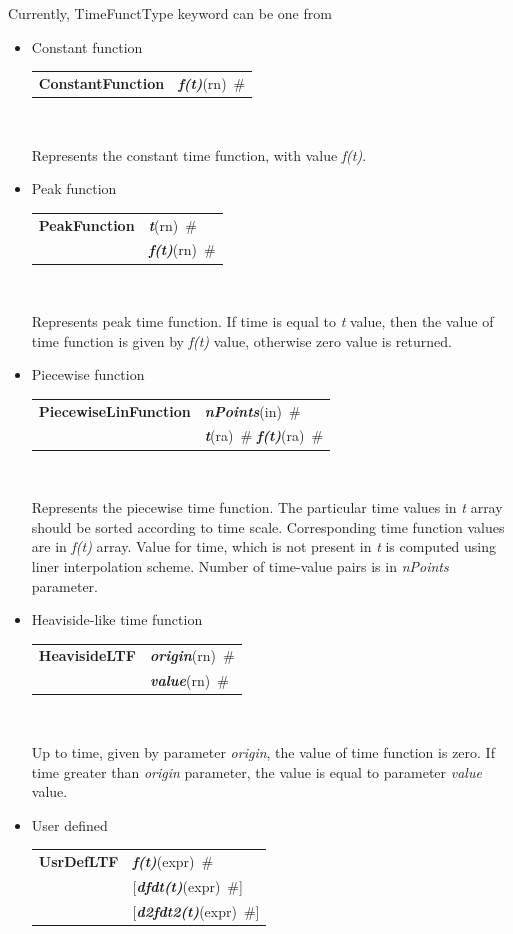 \documentclass[a4paper]{article}
\makeatletter
\newcommand{\param}[1]{{\em #1}}
\newcommand{\keywordnotype}[1]{\mbox{{\it{\bf{#1}}}}}
\newcommand{\keyword}[2]{\mbox{{\keywordnotype{#1}\tiny (#2)}}}
\newcommand{\entKeywordInst}[1]{\mbox{{\bf{{#1}}}}}
\newcommand{\field}[2]{\mbox{\keyword{#1}{#2}~\#}}
\newcommand{\optField}[2]{\mbox{[\field{#1}{#2}]}}
\newenvironment{record}[1][]{\begin{tabular}{|ll}}{\end{tabular}\\}
\newcommand{\recentry}[2]{{#1}&{#2}\\}
\newcounter{rcc}
\newenvironment{record}[1][\textwidth]{\setcounter{rcc}{0}\begin{tabular*}{#1}{|ll@{\extracolsep{\fill}}r}}{\end{tabular*}\\}
\newcommand{\recentry}[2]{\ifthenelse{\value{rcc}>0}{&$\backslash$ \\}{\setcounter{rcc}{1}}{#1}&{#2}}
\makeatother
\begin{document}
Currently, TimeFunctType keyword can be one from
\begin{itemize}
\item Constant function

\noindent
\begin{record}[0.9\textwidth]
    \recentry{\entKeywordInst{ConstantFunction}}{\field{f(t)}{rn}}
\end{record}

Represents the constant time function, with value \param{f(t)}.

\item Peak function

  \begin{record}[0.9\textwidth]
    \recentry{\entKeywordInst{PeakFunction}}{\field{t}{rn}}
    \recentry{}{\field{f(t)}{rn}}
  \end{record}

Represents peak time function. If time is equal to \param{t}
value, then the value of time function is given by \param{f(t)} value,
otherwise zero value is returned.

\item Piecewise function

  \begin{record}[0.9\textwidth]
    \recentry{\entKeywordInst{PiecewiseLinFunction}}{\field{nPoints}{in}}
    \recentry{}{\field{t}{ra} \field{f(t)}{ra}}
  \end{record}

  Represents the piecewise time function. The particular time values in
\param{t} array  should be sorted according to time scale. Corresponding time
function values are in \param{f(t)} array. Value for time, which
is not present in \param{t} is computed using liner interpolation scheme.
Number of time-value pairs is in \param{nPoints} parameter.
\item Heaviside-like time function

  \begin{record}[0.9\textwidth]
    \recentry{\entKeywordInst{HeavisideLTF}}{\field{origin}{rn}}
    \recentry{}{\field{value}{rn}}
  \end{record}

Up to time, given by
parameter \param{origin}, the value of time function is zero. If time
greater than \param{origin} parameter, the value is
equal to parameter \param{value} value.
\item User defined

  \begin{record}[0.9\textwidth]
    \recentry{\entKeywordInst{UsrDefLTF}}{\field{f(t)}{expr}}
    \recentry{}{\optField{dfdt(t)}{expr}} \recentry{}{\optField{d2fdt2(t)}{expr}}
  \end{record}


\end{itemize}
\end{document}

